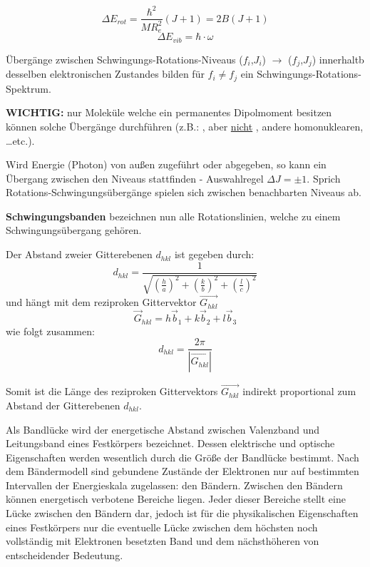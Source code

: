 \[\Delta E_{rot} = \frac{\hbar^2}{M R_e^2}(J+1) = 2B(J+1)\]
\[\Delta E_{vib} = \hbar \cdot \omega\]

\label{q:3}

Übergänge zwischen Schwingungs-Rotations-Niveaus ($f_i$,$J_i$) $\rightarrow$ ($f_j$,$J_j$) innerhaltb desselben elektronischen Zustandes bilden für $f_i \neq f_j$ ein Schwingungs-Rotations-Spektrum.

\textbf{WICHTIG:} nur Moleküle welche ein permanentes Dipolmoment besitzen können solche Übergänge durchführen (z.B.: ,  aber \underline{nicht} , andere homonuklearen, \dots etc.).

Wird Energie (Photon) von außen zugeführt oder abgegeben, so kann ein Übergang zwischen den Niveaus stattfinden - Auswahlregel $\Delta J = \pm 1$. Sprich Rotations-Schwingungsübergänge spielen sich zwischen benachbarten Niveaus ab.

\textbf{Schwingungsbanden} bezeichnen nun alle Rotationslinien, welche zu einem Schwingungsübergang gehören.


\label{q:4}

Der Abstand zweier Gitterebenen $d_{hkl}$ ist gegeben durch:
\[d_{hkl} = \frac{1}{\sqrt{\left(\frac{h}{a}\right)^2 + \left(\frac{k}{b}\right)^2 + \left(\frac{l}{c}\right)^2}}\]
und hängt mit dem reziproken Gittervektor $\vec{G_{hkl}}$ 
\[\vec{G}_{hkl} = h\vec{b}_1 + k\vec{b}_2 + l\vec{b}_3\]
wie folgt zusammen:
\[d_{hkl} = \frac{2\pi}{|\vec{G_{hkl}}|}\]

Somit ist die Länge des reziproken Gittervektors $\vec{G_{hkl}}$ indirekt proportional zum Abstand der Gitterebenen $d_{hkl}$.

\label{q:5}

Als Bandlücke wird der energetische Abstand zwischen Valenzband und Leitungsband eines Festkörpers bezeichnet. Dessen elektrische und optische Eigenschaften werden wesentlich durch die Größe der Bandlücke bestimmt.
Nach dem Bändermodell sind gebundene Zustände der Elektronen nur auf bestimmten Intervallen der Energieskala zugelassen: den Bändern. Zwischen den Bändern können energetisch verbotene Bereiche liegen. Jeder dieser Bereiche stellt eine Lücke zwischen den Bändern dar, jedoch ist für die physikalischen Eigenschaften eines Festkörpers nur die eventuelle Lücke zwischen dem höchsten noch vollständig mit Elektronen besetzten Band und dem nächsthöheren von entscheidender Bedeutung.

